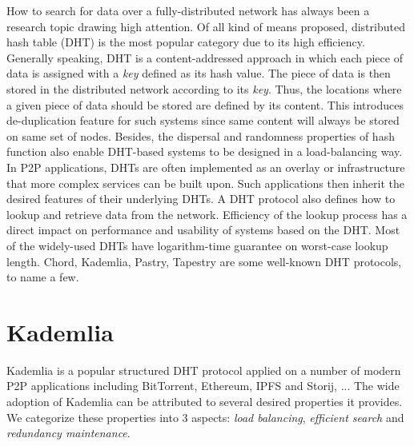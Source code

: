 How to search for data over a fully-distributed network has always been a research topic drawing high attention. Of all kind of means proposed, distributed hash table (DHT) is the most popular category due to its high efficiency. Generally speaking, DHT is a content-addressed approach in which each piece of data is assigned with a \textit{key} defined as its hash value. The piece of data is then stored in the distributed network according to its \textit{key}. Thus, the locations where a given piece of data should be stored are defined by its content. This introduces de-duplication feature for such systems since same content will always be stored on same set of nodes. Besides, the dispersal and randomness properties of hash function also enable DHT-based systems to be designed in a load-balancing way. In P2P applications, DHTs are often implemented as an overlay or infrastructure that more complex services can be built upon. Such applications then inherit the desired features of their underlying DHTs. A DHT protocol also defines how to lookup and retrieve data from the network. Efficiency of the lookup process has a direct impact on performance and usability of systems based on the DHT. Most of the widely-used DHTs have logarithm-time guarantee on worst-case lookup length. Chord\cite{stoica2001chord}, Kademlia\cite{maymounkov2002kademlia}, Pastry\cite{rowstron2001pastry}, Tapestry\cite{zhao2004tapestry} are some well-known DHT protocols, to name a few.

\section{Kademlia}
\label{s:kademlia}
Kademlia\cite{maymounkov2002kademlia} is a popular structured DHT protocol applied on a number of modern P2P applications including BitTorrent\cite{bittorrent}, Ethereum\cite{ethereum}, IPFS\cite{ipfs} and Storij\cite{storij}, ... The wide adoption of Kademlia can be attributed to several desired properties it provides. We categorize these properties into 3 aspects: \textit{load balancing}, \textit{efficient search} and \textit{redundancy maintenance}.

